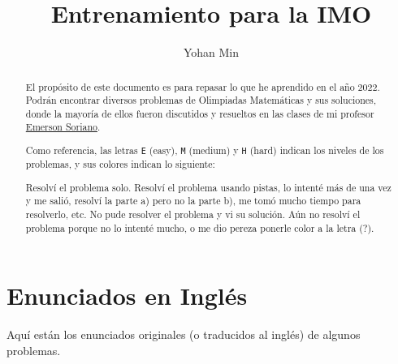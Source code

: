 \documentclass[11pt]{scrartcl}
\title{Entrenamiento para la IMO}
\author{Yohan Min}
\begin{document}
\maketitle

\begin{abstract}
	El propósito de este documento es para repasar lo que he aprendido en el año 2022. Podrán encontrar diversos problemas de Olimpiadas Matemáticas y sus soluciones, donde la mayoría de ellos fueron discutidos y resueltos en las clases de mi profesor \href{https://www.facebook.com/emerson.sorianoperez}{Emerson Soriano}.
	
	Como referencia, las letras \verb|E| (easy), \verb|M| (medium) y \verb|H| (hard) indican los niveles de los problemas, y sus colores indican lo siguiente:
	\begin{description}[labelwidth=\widthof{\texttt{aaaaa}}+1.2em,leftmargin=\widthof{\texttt{aaaaa}a}+1.2em,align=right]
		 Resolví el problema solo.
		 Resolví el problema usando pistas, lo intenté más de una vez y me salió, resolví la parte a) pero no la parte b), me tomó mucho tiempo para resolverlo, etc.
		 No pude resolver el problema y vi su solución.
		 Aún no resolví el problema porque no lo intenté mucho, o me dio pereza ponerle color a la letra (?).
	\end{description}
\end{abstract}

\tableofcontents













%
%
%

\section{Enunciados en Inglés}

Aquí están los enunciados originales (o traducidos al inglés) de algunos problemas.

\makehints
\clearpage
\printbibliography
\end{document}
